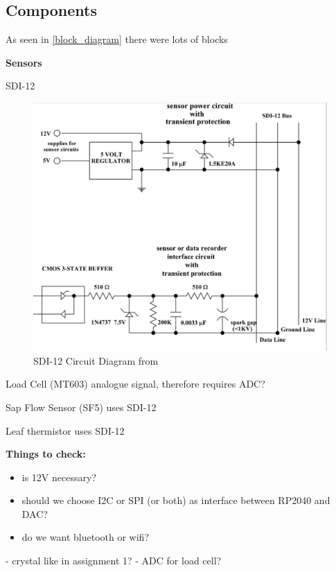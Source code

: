 \subsection{Components}



As seen in \cref{block_diagram} there were lots of blocks


\textbf{Sensors}

SDI-12

\begin{figure}
    \includegraphics[width=\linewidth]{figures/SDI-12 circuit.png}
    \caption{SDI-12 Circuit Diagram from \cite{sdi12_datasheet}}
    \label{sdi12_circuit}
\end{figure}

Load Cell (MT603)
analogue signal, therefore requires ADC?

Sap Flow Sensor (SF5)
uses SDI-12

Leaf thermistor
uses SDI-12

\textbf{Things to check:}
\begin{itemize}
    \item is 12V necessary?
    \item should we choose I2C or SPI (or both) as interface between RP2040 and DAC?
    \item do we want bluetooth or wifi?
\end{itemize}
- crystal like in assignment 1?
- ADC for load cell?
